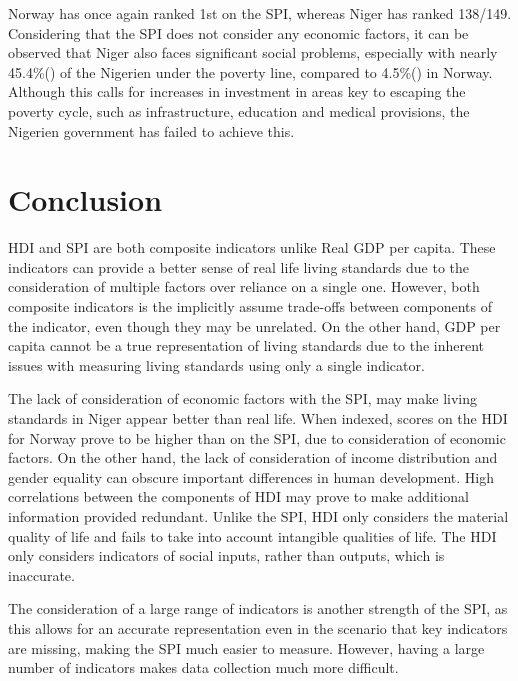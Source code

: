 \documentclass[11pt, a4paper]{article}
\begin{document}
		\vspace*{-6mm}
		Norway has once again ranked 1st on the SPI, whereas Niger has ranked 138/149. Considering that the SPI does not consider any economic factors, it can be observed that Niger also faces significant social problems, especially with nearly 45.4\%(\citeauthor{NigerEconomy20192019}) of the Nigerien under the poverty line, compared to 4.5\%(\citeauthor{NorwayEconomy20192019}) in Norway. Although this calls for increases in investment in areas key to escaping the poverty cycle, such as infrastructure, education and medical provisions, the Nigerien government has failed to achieve this.

		
		\vspace*{-6mm}
		\section{Conclusion}
		HDI and SPI are both composite indicators unlike Real GDP per capita. These indicators can provide a better sense of real life living standards due to the consideration of multiple factors over reliance on a single one. However, both composite indicators is the implicitly assume trade-offs between components of the indicator, even though they may be unrelated. On the other hand, GDP per capita cannot be a true representation of living standards due to the inherent issues with measuring living standards using only a single indicator.

		The lack of consideration of economic factors with the SPI, may make living standards in Niger appear better than real life. When indexed, scores on the HDI for Norway prove to be higher than on the SPI, due to consideration of economic factors. On the other hand, the lack of consideration of income distribution and gender equality can obscure important differences in human development. High correlations between the components of HDI may prove to make additional information provided redundant. Unlike the SPI, HDI only considers the material quality of life and fails to take into account intangible qualities of life. The HDI only considers indicators of social inputs, rather than outputs, which is inaccurate.

		The consideration of a large range of indicators is another strength of the SPI, as this allows for an accurate representation even in the scenario that key indicators are missing, making the SPI much easier to measure. However, having a large number of indicators makes data collection much more difficult. 
\end{document}
